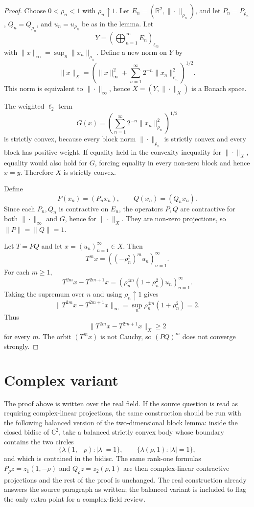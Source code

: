 \documentclass[11pt]{article}
\begin{document}
\begin{proof}
Choose $0<\rho_n<1$ with $\rho_n\uparrow 1$.  Let
$E_n=(\mathbb R^2,\|\cdot\|_{\rho_n})$, and let
$P_n=P_{\rho_n}$, $Q_n=Q_{\rho_n}$, and $u_n=u_{\rho_n}$ be as in the lemma.
Let
\[
  Y=\left(\bigoplus_{n=1}^\infty E_n\right)_{\ell_\infty}
\]
with $\|x\|_\infty=\sup_n\|x_n\|_{\rho_n}$.  Define a new norm on $Y$ by
\[
  \|x\|_X=
  \left(
    \|x\|_\infty^2+
    \sum_{n=1}^\infty 2^{-n}\|x_n\|_{\rho_n}^2
  \right)^{1/2}.
\]
This norm is equivalent to $\|\cdot\|_\infty$, hence $X=(Y,\|\cdot\|_X)$ is a
Banach space.

The weighted $\ell_2$ term
\[
  G(x)=\left(\sum_{n=1}^\infty 2^{-n}\|x_n\|_{\rho_n}^2\right)^{1/2}
\]
is strictly convex, because every block norm $\|\cdot\|_{\rho_n}$ is strictly
convex and every block has positive weight.  If equality held in the convexity
inequality for $\|\cdot\|_X$, equality would also hold for $G$, forcing
equality in every non-zero block and hence $x=y$.  Therefore $X$ is strictly
convex.

Define
\[
  P(x_n)=(P_nx_n),\qquad Q(x_n)=(Q_nx_n).
\]
Since each $P_n,Q_n$ is contractive on $E_n$, the operators $P,Q$ are
contractive for both $\|\cdot\|_\infty$ and $G$, hence for $\|\cdot\|_X$.
They are non-zero projections, so $\|P\|=\|Q\|=1$.

Let $T=PQ$ and let $x=(u_n)_{n=1}^\infty\in X$.  Then
\[
  T^m x=\left((-\rho_n^2)^m u_n\right)_{n=1}^\infty.
\]
For each $m\geq 1$,
\[
  T^{2m}x-T^{2m+1}x
  =
  \left(\rho_n^{4m}(1+\rho_n^2)u_n\right)_{n=1}^\infty.
\]
Taking the supremum over $n$ and using $\rho_n\uparrow 1$ gives
\[
  \|T^{2m}x-T^{2m+1}x\|_\infty
  =
  \sup_n \rho_n^{4m}(1+\rho_n^2)=2.
\]
Thus
\[
  \|T^{2m}x-T^{2m+1}x\|_X\geq 2
\]
for every $m$.  The orbit $(T^m x)$ is not Cauchy, so $(PQ)^m$ does not
converge strongly.
\end{proof}

\section*{Complex variant}

The proof above is written over the real field.  If the source question is
read as requiring complex-linear projections, the same construction should be
run with the following balanced version of the two-dimensional block lemma:
inside the closed bidisc of $\mathbb C^2$, take a balanced strictly convex
body whose boundary contains the two circles
\[
  \{\lambda(1,-\rho):|\lambda|=1\},\qquad
  \{\lambda(\rho,1):|\lambda|=1\},
\]
and which is contained in the bidisc.  The same rank-one formulas
$P_\rho z=z_1(1,-\rho)$ and $Q_\rho z=z_2(\rho,1)$ are then complex-linear
contractive projections and the rest of the proof is unchanged.  The real
construction already answers the source paragraph as written; the balanced
variant is included to flag the only extra point for a complex-field review.
\end{document}
